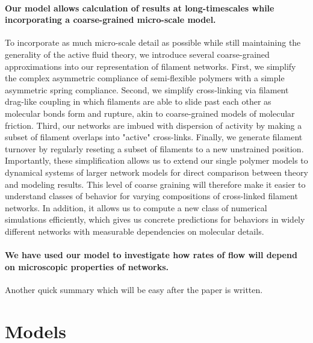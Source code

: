 \documentclass[10pt,letterpaper]{article}
\begin{document}
\paragraph{Our model allows calculation of results at long-timescales while incorporating a coarse-grained micro-scale model.}  
To incorporate as much micro-scale detail as possible while still maintaining the generality of the active fluid theory, we introduce several coarse-grained approximations into our representation of filament networks.  First, we simplify the complex asymmetric compliance of semi-flexible polymers with a simple asymmetric spring compliance.  Second, we simplify cross-linking via filament drag-like coupling in which filaments are able to slide past each other as molecular bonds form and rupture, akin to coarse-grained models of molecular friction\cite{theo_friction,theo_frictionSam,theo_molefric}.  Third, our networks are imbued with dispersion of activity by making a subset of filament overlaps into "active" cross-links\cite{theo_frictionShila}.  Finally, we generate filament turnover by regularly reseting a subset of filaments to a new unstrained position.  Importantly, these simplification allows us to extend our single polymer models to dynamical systems of larger network models for direct comparison between theory and modeling results.  This level of coarse graining will therefore make it easier to understand classes of behavior for varying compositions of cross-linked filament networks.  In addition, it allows us to compute a new class of numerical simulations efficiently, which gives us concrete predictions for behaviors in widely different networks with measurable dependencies on molecular details.

  

\paragraph{We have used our model to investigate how rates of flow will depend on microscopic properties of networks.}
Another quick summary which will be easy after the paper is written. 


\section*{Models}
\end{document}
